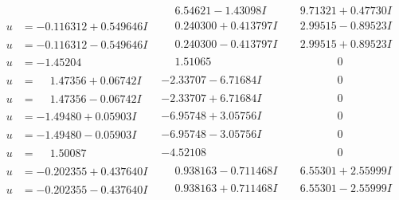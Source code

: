 \documentclass[1p]{elsarticle_modified}
\theoremstyle{definition}
\begin{document}
$$\begin{array}{c|c|c}
 & \phantom{-}6.54621 - 1.43098 I & \phantom{-}9.71321 + 0.47730 I \\ \hline\begin{aligned}
u &= -0.116312 + 0.549646 I\end{aligned}
 & \phantom{-}0.240300 + 0.413797 I & \phantom{-}2.99515 - 0.89523 I \\ \hline\begin{aligned}
u &= -0.116312 - 0.549646 I\end{aligned}
 & \phantom{-}0.240300 - 0.413797 I & \phantom{-}2.99515 + 0.89523 I \\ \hline\begin{aligned}
u &= -1.45204\phantom{ +0.000000I}\end{aligned}
 & \phantom{-}1.51065\phantom{ +0.000000I} & \phantom{-0.000000 } 0 \\ \hline\begin{aligned}
u &= \phantom{-}1.47356 + 0.06742 I\end{aligned}
 & -2.33707 - 6.71684 I & \phantom{-0.000000 } 0 \\ \hline\begin{aligned}
u &= \phantom{-}1.47356 - 0.06742 I\end{aligned}
 & -2.33707 + 6.71684 I & \phantom{-0.000000 } 0 \\ \hline\begin{aligned}
u &= -1.49480 + 0.05903 I\end{aligned}
 & -6.95748 + 3.05756 I & \phantom{-0.000000 } 0 \\ \hline\begin{aligned}
u &= -1.49480 - 0.05903 I\end{aligned}
 & -6.95748 - 3.05756 I & \phantom{-0.000000 } 0 \\ \hline\begin{aligned}
u &= \phantom{-}1.50087\phantom{ +0.000000I}\end{aligned}
 & -4.52108\phantom{ +0.000000I} & \phantom{-0.000000 } 0 \\ \hline\begin{aligned}
u &= -0.202355 + 0.437640 I\end{aligned}
 & \phantom{-}0.938163 - 0.711468 I & \phantom{-}6.55301 + 2.55999 I \\ \hline\begin{aligned}
u &= -0.202355 - 0.437640 I\end{aligned}
 & \phantom{-}0.938163 + 0.711468 I & \phantom{-}6.55301 - 2.55999 I \\ \hline\begin{aligned}

\end{aligned}
\end{array}$$
\end{document}
